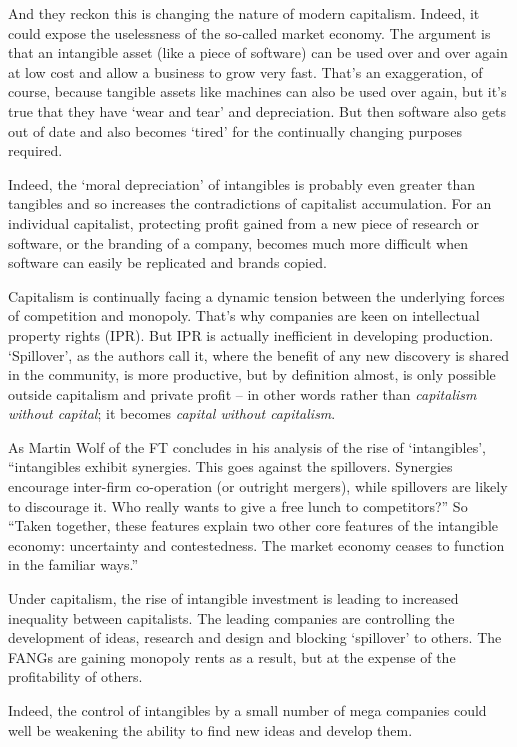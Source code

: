 \documentclass[
]{book}
\begin{document}
And they reckon this is changing the nature of modern capitalism. Indeed, it could expose the uselessness of the so-called market economy. The argument is that an intangible asset (like a piece of software) can be used over and over again at low cost and allow a business to grow very fast. That's an exaggeration, of course, because tangible assets like machines can also be used over again, but it's true that they have `wear and tear' and depreciation. But then software also gets out of date and also becomes `tired' for the continually changing purposes required.

Indeed, the `moral depreciation' of intangibles is probably even greater than tangibles and so increases the contradictions of capitalist accumulation. For an individual capitalist, protecting profit gained from a new piece of research or software, or the branding of a company, becomes much more difficult when software can easily be replicated and brands copied.

Capitalism is continually facing a dynamic tension between the underlying forces of competition and monopoly.
That's why companies are keen on intellectual property rights (IPR). But IPR is actually inefficient in developing production. `Spillover', as the authors call it, where the benefit of any new discovery is shared in the community, is more productive, but by definition almost, is only possible outside capitalism and private profit -- in other words rather than \emph{capitalism without capital}; it becomes \emph{capital without capitalism}.

As Martin Wolf of the FT concludes in his analysis of the rise of `intangibles', ``intangibles exhibit synergies. This goes against the spillovers. Synergies encourage inter-firm co-operation (or outright mergers), while spillovers are likely to discourage it. Who really wants to give a free lunch to competitors?'' So ``Taken together, these features explain two other core features of the intangible economy: uncertainty and contestedness. The market economy ceases to function in the familiar ways.''

Under capitalism, the rise of intangible investment is leading to increased inequality between capitalists. The leading companies are controlling the development of ideas, research and design and blocking `spillover' to others. The FANGs are gaining monopoly rents as a result, but at the expense of the profitability of others.

Indeed, the control of intangibles by a small number of mega companies could well be weakening the ability to find new ideas and develop them.
\end{document}
